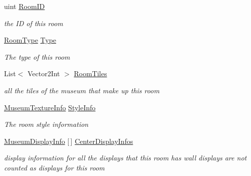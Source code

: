 \begin{DoxyCompactItemize}
\item 
uint \mbox{\hyperlink{class_room_a499df97242b8996b66cc22737159f59c}{Room\+ID}}
\begin{DoxyCompactList}\small\item\em the ID of this room \end{DoxyCompactList}\item 
\mbox{\hyperlink{_room_8cs_ab540f7414f306325d92272bcef1e34e1}{Room\+Type}} \mbox{\hyperlink{class_room_a55dc5c580ea31562a0aa6f11b4b8f462}{Type}}
\begin{DoxyCompactList}\small\item\em The type of this room \end{DoxyCompactList}\item 
List$<$ Vector2\+Int $>$ \mbox{\hyperlink{class_room_aed67349f7f161cb2214111eff3e51018}{Room\+Tiles}}
\begin{DoxyCompactList}\small\item\em all the tiles of the museum that make up this room \end{DoxyCompactList}\item 
\mbox{\hyperlink{class_museum_texture_info}{Museum\+Texture\+Info}} \mbox{\hyperlink{class_room_a3cd7f8c4f2ee7b7397a40a463cd14196}{Style\+Info}}
\begin{DoxyCompactList}\small\item\em The room style information \end{DoxyCompactList}\item 
\mbox{\hyperlink{class_museum_display_info}{Museum\+Display\+Info}} \mbox{[}$\,$\mbox{]} \mbox{\hyperlink{class_room_ab7a1da4fa70bf843d643391bdbaa1fb5}{Center\+Display\+Infos}}
\begin{DoxyCompactList}\small\item\em display information for all the displays that this room has wall displays are not counted as displays for this room \end{DoxyCompactList}\end{DoxyCompactItemize}
